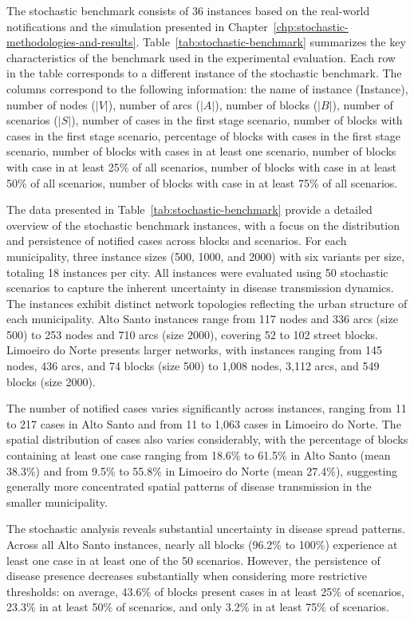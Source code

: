 The stochastic benchmark consists of 36 instances based on the real-world notifications and the simulation presented in Chapter~\ref{chp:stochastic-methodologies-and-results}. Table~\ref{tab:stochastic-benchmark} summarizes the key characteristics of the benchmark used in the experimental evaluation. Each row in the table corresponds to a different instance of the stochastic benchmark. The columns correspond to the following information: the name of instance (Instance), number of nodes ($|V|$), number of arcs ($|A|$), number of blocks ($|B|$), number of scenarios ($|S|$), number of cases in the first stage scenario, number of blocks with cases in the first stage scenario, percentage of blocks with cases in the first stage scenario, number of blocks with cases in at least one scenario, number of blocks with case in at least 25\% of all scenarios, number of blocks with case in at least 50\% of all scenarios, number of blocks with case in at least 75\% of all scenarios.

The data presented in Table~\ref{tab:stochastic-benchmark} provide a detailed overview of the stochastic benchmark instances, with a focus on the distribution and persistence of notified cases across blocks and scenarios. For each municipality, three instance sizes (500, 1000, and 2000) with six variants per size, totaling 18 instances per city. All instances were evaluated using 50 stochastic scenarios to capture the inherent uncertainty in disease transmission dynamics. The instances exhibit distinct network topologies reflecting the urban structure of each municipality. Alto Santo instances range from 117 nodes and 336 arcs (size 500) to 253 nodes and 710 arcs (size 2000), covering 52 to 102 street blocks. Limoeiro do Norte presents larger networks, with instances ranging from 145 nodes, 436 arcs, and 74 blocks (size 500) to 1,008 nodes, 3,112 arcs, and 549 blocks (size 2000). 

The number of notified cases varies significantly across instances, ranging from 11 to 217 cases in Alto Santo and from 11 to 1,063 cases in Limoeiro do Norte. The spatial distribution of cases also varies considerably, with the percentage of blocks containing at least one case ranging from 18.6\% to 61.5\% in Alto Santo (mean 38.3\%) and from 9.5\% to 55.8\% in Limoeiro do Norte (mean 27.4\%), suggesting generally more concentrated spatial patterns of disease transmission in the smaller municipality.

The stochastic analysis reveals substantial uncertainty in disease spread patterns. Across all Alto Santo instances, nearly all blocks (96.2\% to 100\%) experience at least one case in at least one of the 50 scenarios. However, the persistence of disease presence decreases substantially when considering more restrictive thresholds: on average, 43.6\% of blocks present cases in at least 25\% of scenarios, 23.3\% in at least 50\% of scenarios, and only 3.2\% in at least 75\% of scenarios. 

